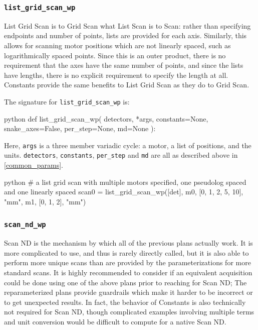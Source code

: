 \subsubsection{\texttt{list\_grid\_scan\_wp}}

List Grid Scan is to Grid Scan what List Scan is to Scan: rather than specifying endpoints and number of points, lists are provided for each axis.
Similarly, this allows for scanning motor positions which are not linearly spaced, such as logarithmically spaced points.
Since this is an outer product, there is no requirement that the axes have the same number of points, and since the lists have lengths, there is no explicit requirement to specify the length at all.
Constants provide the same benefits to List Grid Scan as they do to Grid Scan.

The signature for \texttt{list\_grid\_scan\_wp} is:

\begin{codefragment}{python}
def list_grid_scan_wp(
    detectors, *args, constants=None, snake_axes=False, per_step=None, md=None
):
\end{codefragment}

Here, \texttt{args} is a three member variadic cycle: a motor, a list of positions, and the units.
\texttt{detectors}, \texttt{constants}, \texttt{per\_step} and \texttt{md} are all as described above in \ref{common_params}.

\begin{codefragment}{python}
# a list grid scan with multiple motors specified, one pseudolog spaced and one linearly spaced
scan0 = list_grid_scan_wp([det], m0, [0, 1, 2, 5, 10], "mm",
                                 m1, [0, 1, 2], "mm")
\end{codefragment}

\subsubsection{\texttt{scan\_nd\_wp}}

Scan ND is the mechanism by which all of the previous plans actually work.
It is more complicated to use, and thus is rarely directly called, but it is also able to perform more unique scans than are provided by the parameterizations for more standard scans.
It is highly recommended to consider if an equivalent acquisition could be done using one of the above plans prior to reaching for Scan ND; The reparameterized plans provide guardrails which make it harder to be incorrect or to get unexpected results.
In fact, the behavior of Constants is also technically not required for Scan ND, though complicated examples involving multiple terms and unit conversion would be difficult to compute for a native Scan ND.

